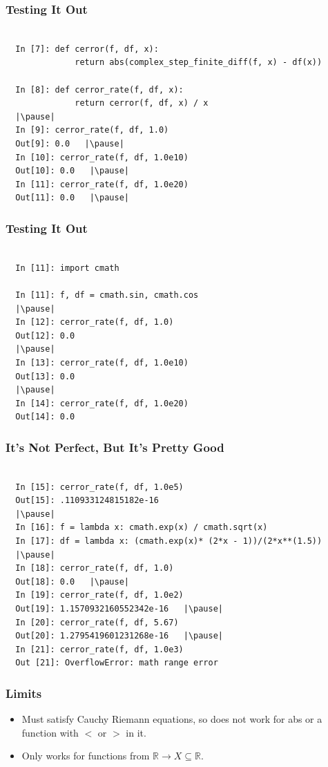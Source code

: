 \documentclass{beamer}
\def\R{\mathbb{R}}                     %
\begin{document}
\begin{frame}[fragile]
\frametitle{Testing It Out}

\begin{lstlisting}

  In [7]: def cerror(f, df, x):
              return abs(complex_step_finite_diff(f, x) - df(x))

  In [8]: def cerror_rate(f, df, x):
              return cerror(f, df, x) / x
  |\pause|
  In [9]: cerror_rate(f, df, 1.0)
  Out[9]: 0.0   |\pause|
  In [10]: cerror_rate(f, df, 1.0e10)
  Out[10]: 0.0   |\pause|
  In [11]: cerror_rate(f, df, 1.0e20)
  Out[11]: 0.0   |\pause|
\end{lstlisting}

\end{frame}

\begin{frame}[fragile]
\frametitle{Testing It Out}

\begin{lstlisting}

  In [11]: import cmath

  In [11]: f, df = cmath.sin, cmath.cos
  |\pause|
  In [12]: cerror_rate(f, df, 1.0)
  Out[12]: 0.0
  |\pause|
  In [13]: cerror_rate(f, df, 1.0e10)
  Out[13]: 0.0
  |\pause|
  In [14]: cerror_rate(f, df, 1.0e20)
  Out[14]: 0.0
\end{lstlisting}

\end{frame}

\begin{frame}[fragile]
\frametitle{It's Not Perfect, But It's Pretty Good}

\begin{lstlisting}

  In [15]: cerror_rate(f, df, 1.0e5)
  Out[15]: .110933124815182e-16
  |\pause|
  In [16]: f = lambda x: cmath.exp(x) / cmath.sqrt(x)
  In [17]: df = lambda x: (cmath.exp(x)* (2*x - 1))/(2*x**(1.5))
  |\pause|
  In [18]: cerror_rate(f, df, 1.0)
  Out[18]: 0.0   |\pause|
  In [19]: cerror_rate(f, df, 1.0e2)
  Out[19]: 1.1570932160552342e-16   |\pause|
  In [20]: cerror_rate(f, df, 5.67)
  Out[20]: 1.2795419601231268e-16   |\pause|
  In [21]: cerror_rate(f, df, 1.0e3)
  Out [21]: OverflowError: math range error

\end{lstlisting}

\end{frame}


\begin{frame}
\frametitle{Limits}

  \begin{itemize}
    \item Must satisfy Cauchy Riemann equations, so does not work for abs or a function with $<$ or $>$ in it.
    \item Only works for functions from $\R \to X \subseteq \R$.
  \end{itemize}

\end{frame}
\end{document}
